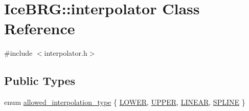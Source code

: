 \hypertarget{classIceBRG_1_1interpolator}{}\section{Ice\+B\+R\+G\+:\+:interpolator Class Reference}
\label{classIceBRG_1_1interpolator}


{\ttfamily \#include $<$interpolator.\+h$>$}

\subsection*{Public Types}
\begin{DoxyCompactItemize}
\item 
enum \hyperlink{classIceBRG_1_1interpolator_af85c1c6a292cff6fa033c8884377544a}{allowed\+\_\+interpolation\+\_\+type} \{ \hyperlink{classIceBRG_1_1interpolator_af85c1c6a292cff6fa033c8884377544aa0e985c423ddff0958b7c077f040e5910}{L\+O\+W\+E\+R}, 
\hyperlink{classIceBRG_1_1interpolator_af85c1c6a292cff6fa033c8884377544aaef8ca61ed663ed472fff05ac0eb84e2c}{U\+P\+P\+E\+R}, 
\hyperlink{classIceBRG_1_1interpolator_af85c1c6a292cff6fa033c8884377544aae6ba3f064dbbd6f454104dd90acb04d4}{L\+I\+N\+E\+A\+R}, 
\hyperlink{classIceBRG_1_1interpolator_af85c1c6a292cff6fa033c8884377544aaca79b1f8a9979bf41b4216bc8030232d}{S\+P\+L\+I\+N\+E}
 \}
\end{DoxyCompactItemize}
